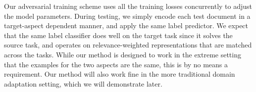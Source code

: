 Our adversarial training scheme uses all the training losses concurrently to adjust the model parameters. During testing, we simply encode each test document in a target-aspect dependent manner, and apply the same label predictor. We expect that the same label classifier does well on the target task since it solves the source task, and operates on relevance-weighted representations that are matched across the tasks. 
While our method is designed to work in the extreme setting that the examples for the two aspects are the same, this is by no means a requirement. Our method will also work fine in the more traditional domain adaptation setting, which we will demonstrate later.





